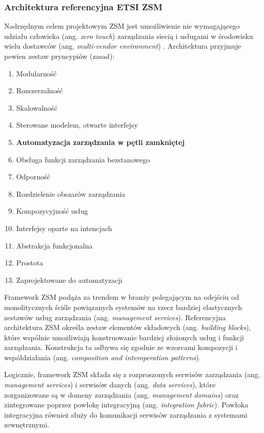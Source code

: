 \subsubsection{Architektura referencyjna ETSI ZSM}\hypertarget{sec:zsm}{}
Nadrzędnym celem projektowym ZSM jest umożliwienie nie wymagającego udziału człowieka (ang. \textit{zero touch}) zarządzania siecią i usługami w środowisku wielu dostawców (ang. \textit{multi-vendor environment}) \cite{etsizsm2018}. Architektura przyjmuje pewien zestaw pryncypiów (zasad):
\begin{enumerate}\hypertarget{list:2}{}
    \item Modularność  
    \item Rozszerzalność  
    \item Skalowalność  
    \item Sterowane modelem, otwarte interfejsy  
    \item \textbf{Automatyzacja zarządzania w pętli zamkniętej}  
    \item Obsługa funkcji zarządzania bezstanowego  
    \item Odporność  
    \item Rozdzielenie obszarów zarządzania  
    \item Kompozycyjność usług  
    \item Interfejsy oparte na intencjach  
    \item Abstrakcja funkcjonalna  
    \item Prostota  
    \item Zaprojektowane do automatyzacji  
\end{enumerate}

Framework ZSM podąża za trendem w branży polegającym na odejściu od monolitycznych ściśle powiązanych systemów na rzecz bardziej elastycznych zestawów usług zarządzania (ang. \textit{management services}). Referencyjna architektura ZSM określa zestaw elementów składowych (ang. \textit{building blocks}), które wspólnie umożliwiają konstruowanie bardziej złożonych usług i funkcji zarządzania. Konstrukcja ta odbywa się zgodnie ze wzorcami kompozycji i współdziałania (ang. \textit{composition and interoperation patterns}). 

Logicznie, framework ZSM składa się z rozproszonych serwisów zarządzania (ang. \textit{management services}) i serwisów danych (ang. \textit{data services}), które zorganizowane są w domeny zarządzania (ang. \textit{management domains}) oraz zintegrowane poprzez powłokę integracyjną (ang. \textit{integration fabric}). Powłoka integracyjna również służy do komunikacji serwisów zarządzania z systemami zewnętrznymi.

